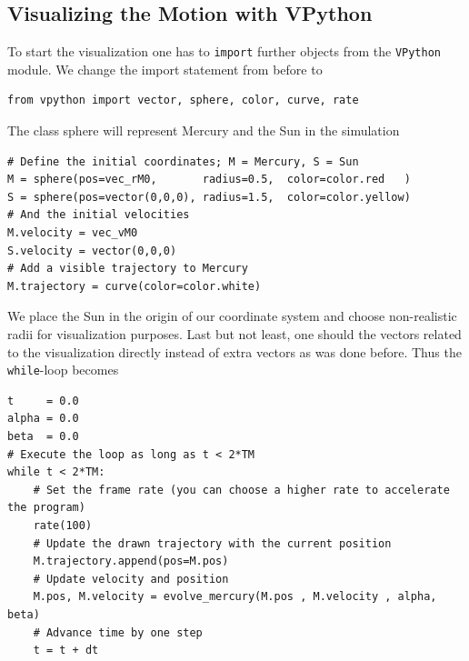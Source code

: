 \documentclass[12pt,ngerman,american]{iopart}
\begin{document}
\subsection{Visualizing the Motion with VPython}
To start the visualization one has to \texttt{import} further objects from the \texttt{VPython} module.
We change the import statement from before to
\begin{lstlisting}
from vpython import vector, sphere, color, curve, rate
\end{lstlisting}
The class sphere will represent Mercury and the Sun in the simulation
\begin{lstlisting}
# Define the initial coordinates; M = Mercury, S = Sun
M = sphere(pos=vec_rM0,       radius=0.5,  color=color.red   )
S = sphere(pos=vector(0,0,0), radius=1.5,  color=color.yellow)
# And the initial velocities
M.velocity = vec_vM0
S.velocity = vector(0,0,0)
# Add a visible trajectory to Mercury
M.trajectory = curve(color=color.white)
\end{lstlisting}
We place the Sun in the origin of our coordinate system and choose non-realistic radii for visualization purposes.
Last but not least, one should the vectors related to the visualization directly instead of extra vectors as was done before. Thus
the \texttt{while}-loop becomes
\begin{lstlisting}
t     = 0.0
alpha = 0.0
beta  = 0.0
# Execute the loop as long as t < 2*TM
while t < 2*TM:
    # Set the frame rate (you can choose a higher rate to accelerate the program)
    rate(100)
    # Update the drawn trajectory with the current position
    M.trajectory.append(pos=M.pos)
    # Update velocity and position
    M.pos, M.velocity = evolve_mercury(M.pos , M.velocity , alpha, beta)
    # Advance time by one step
    t = t + dt
\end{lstlisting}
\end{document}
